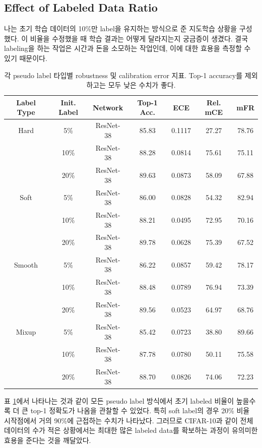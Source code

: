 \documentclass[a4paper, 10pt]{article}
\begin{document}
\subsection{Effect of Labeled Data Ratio}
나는 초기 학습 데이터의 10\%만 label을 유지하는 방식으로 준 지도학습 상황을
구성했다. 이 비율을 수정했을 때 학습 결과는 어떻게 달라지는지 궁금증이 생겼다.
결국 labeling을 하는 작업은 시간과 돈을 소모하는 작업인데, 이에 대한 효용을
측정할 수 있기 때문이다.
\begin{table}[!h]
  \center 
  \begin{tabular}{|c|c|c|c|c|c|c|}
    \hline
    Label Type & Init. Label & Network & Top-1 Acc. & ECE & Rel. mCE & mFR \\ \hline
    Hard & 5\% & ResNet-38 & 85.83 & 0.1117 & 27.27 & 78.76 \\
     & 10\% & ResNet-38 & 88.28 & 0.0814 & 75.61 & 75.11 \\
     & 20\% & ResNet-38 & 89.63 & 0.0873 & 58.09 & 67.88 \\ \hline
    Soft & 5\% & ResNet-38 & 86.00 & 0.0828 & 54.32 & 82.94 \\
     & 10\% & ResNet-38 & 88.21 & 0.0495 & 72.95 & 70.16 \\
     & 20\% & ResNet-38 & 89.78 & 0.0628 & 75.39 & 67.52 \\ \hline
    Smooth & 5\% & ResNet-38 & 86.22 & 0.0857 & 59.42 & 78.17 \\
     & 10\% & ResNet-38 & 88.48 & 0.0789 & 76.94 & 73.39 \\
     & 20\% & ResNet-38 & 89.56 & 0.0523 & 64.97 & 68.76 \\ \hline
    Mixup & 5\% & ResNet-38 & 85.42 & 0.0723 & 38.80 & 89.66 \\
     & 10\% & ResNet-38 & 87.78 & 0.0780 & 50.11 & 75.58 \\
     & 20\% & ResNet-38 & 88.70 & 0.0826 & 74.06 & 72.23 \\ \hline
  \end{tabular}    
  \caption{각 pseudo label 타입별 robustness 및 calibration error 지표. Top-1 accuracy를 제외하고는 모두 낮은 수치가 좋다.}
  \label{ratio}
\end{table}
표 \ref{ratio}에서 나타나는 것과 같이 모든 pseudo label 방식에서 초기 labeled
비율이 높을수록 더 큰 top-1 정확도가 나옴을 관찰할 수 있었다. 특히 soft label의
경우 20\% 비율 시작점에서 거의 90\%에 근접하는 수치가 나타났다. 그러므로
CIFAR-10과 같이 전체 데이터의 수가 적은 상황에서는 최대한 많은 labeled data를
확보하는 과정이 유의미한 효용을 준다는 것을 깨달았다.
\end{document}
